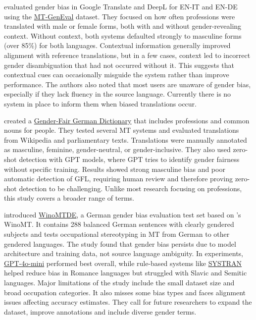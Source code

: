 \textbf{\citet{rescignoGenderBiasMachine2023}} evaluated gender bias in Google Translate and DeepL for EN-IT and EN-DE using the \href{https://github.com/amazon-science/machine-translation-gender-eval}{MT-GenEval} dataset. They focused on how often professions were translated with male or female forms, both with and without gender-revealing context. Without context, both systems defaulted strongly to masculine forms (over 85\%) for both languages. Contextual information generally improved alignment with reference translations, but in a few cases, context led to incorrect gender disambiguation that had not occurred without it. This suggests that contextual cues can occasionally misguide the system rather than improve performance. The authors also noted that most users are unaware of gender bias, especially if they lack fluency in the source language. Currently there is no system in place to inform them when biased translations occur.

\textbf{\citet{lardelliBuildingBridgesDataset2024}} created a \href{https://github.com/g8a9/building-bridges-gender-fair-german-mt}{Gender-Fair German Dictionary} that includes professions and common nouns for people. They tested several MT systems and evaluated translations from Wikipedia and parliamentary texts. Translations were manually annotated as masculine, feminine, gender-neutral, or gender-inclusive. They also used zero-shot detection with GPT models, where GPT tries to identify gender fairness without specific training. Results showed strong masculine bias and poor automatic detection of GFL, requiring human review and therefore proving zero-shot detection to be challenging. Unlike most research focusing on professions, this study covers a broader range of terms.

\textbf{\citet{kapplAreAllSpanish2025}} introduced \href{https://github.com/michellekappl/mt_gender_german}{WinoMTDE}, a German gender bias evaluation test set based on \citealp{stanovskyEvaluatingGenderBias2019}'s WinoMT. It contains 288 balanced German sentences with clearly gendered subjects and tests occupational stereotyping in MT from German to other gendered languages. The study found that gender bias persists due to model architecture and training data, not source language ambiguity. In experiments, \href{https://openai.com/index/gpt-4o-mini-advancing-cost-efficient-intelligence/}{GPT-4o-mini} performed best overall, while rule-based systems like \href{https://www.systransoft.com/}{SYSTRAN} helped reduce bias in Romance languages but struggled with Slavic and Semitic languages. Major limitations of the study include the small dataset size and broad occupation categories. It also misses some bias types and faces alignment issues affecting accuracy estimates. They call for future researchers to expand the dataset, improve annotations and include diverse gender terms.


